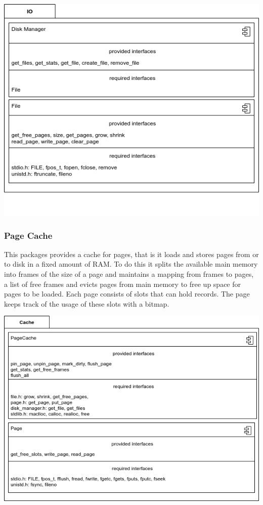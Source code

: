         \begin{center}
         \includegraphics[keepaspectratio, width=\textwidth, height=0.3\textheight]{img/io_arch.png} \\
        \end{center}

    \subsubsection{Page Cache}
        This packages provides a cache for pages, that is it loads and stores pages from or to disk in a fixed amount of RAM. To do this it splits the available main memory into frames of the size of a page and maintains a mapping from frames to pages, a list of free frames and evicts pages from main memory to free up space for pages to be loaded. Each page consists of slots that can hold records. The page keeps track of the usage of these slots with a bitmap. \\
        \begin{center}
         \includegraphics[keepaspectratio, width=\textwidth, height=0.3\textheight]{img/cache_arch.png} \\
        \end{center}
        \newpage
        
